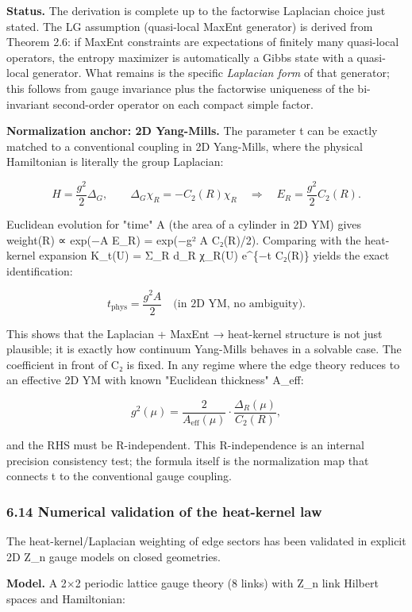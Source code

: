 \textbf{Status.} The derivation is complete up to the factorwise Laplacian choice just stated. The LG assumption (quasi-local MaxEnt generator) is derived from Theorem 2.6: if MaxEnt constraints are expectations of finitely many quasi-local operators, the entropy maximizer is automatically a Gibbs state with a quasi-local generator. What remains is the specific \emph{Laplacian form} of that generator; this follows from gauge invariance plus the factorwise uniqueness of the bi-invariant second-order operator on each compact simple factor.

\textbf{Normalization anchor: 2D Yang-Mills.} The parameter t can be exactly matched to a conventional coupling in 2D Yang-Mills, where the physical Hamiltonian is literally the group Laplacian:

\[
H = \frac{g^2}{2} \Delta_G, \qquad
\Delta_G \chi_R = -C_2(R) \chi_R
\quad \Rightarrow \quad
E_R = \frac{g^2}{2} C_2(R).
\]

Euclidean evolution for "time" A (the area of a cylinder in 2D YM) gives weight(R) ∝ exp(−A E\_R) = exp(−g² A C₂(R)/2). Comparing with the heat-kernel expansion K\_t(U) = Σ\_R d\_R χ\_R(U) e\^{}\{−t C₂(R)\} yields the exact identification:

\[
t_\mathrm{phys} = \frac{g^2 A}{2} \quad \text{(in 2D YM, no ambiguity).}
\]

This shows that the Laplacian + MaxEnt → heat-kernel structure is not just plausible; it is exactly how continuum Yang-Mills behaves in a solvable case. The coefficient in front of C₂ is fixed. In any regime where the edge theory reduces to an effective 2D YM with known "Euclidean thickness" A\_eff:

\[
g^2(\mu) = \frac{2}{A_\mathrm{eff}(\mu)} \cdot \frac{\Delta_R(\mu)}{C_2(R)},
\]

and the RHS must be R-independent. This R-independence is an internal precision consistency test; the formula itself is the normalization map that connects t to the conventional gauge coupling.

\subsubsection{6.14 Numerical validation of the heat-kernel law}\label{614-numerical-validation-of-the-heat-kernel-law}

The heat-kernel/Laplacian weighting of edge sectors has been validated in explicit 2D Z\_n gauge models on closed geometries.

\textbf{Model.} A 2×2 periodic lattice gauge theory (8 links) with Z\_n link Hilbert spaces and Hamiltonian:


